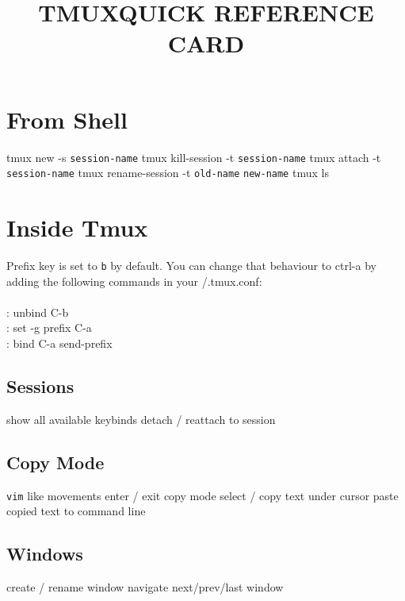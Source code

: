
\def\content{TMUX}
\def\versionnumber{0.1}  %
\def\year{2014}
\def\month{May}
\def\version{v\versionnumber\ \month\ \year}



\title{\content QUICK REFERENCE CARD}

\shortintro

\section{From Shell}{}

	{tmux new -s {\tt session-name}}
	{tmux kill-session -t {\tt session-name}}
	{tmux attach -t {\tt session-name}}
	{tmux rename-session -t {\tt old-name} {\tt new-name}}
	{tmux ls}

\section{Inside Tmux}{Prefix key is set to {\tt \ctrl b} by default. You can
    change that behaviour to ctrl-a by adding the following
    commands in your \tild/.tmux.conf:\\\\
: unbind C-b\\
: set -g prefix C-a\\
: bind C-a send-prefix\\
}

\subsection{Sessions}{}
	{show all available keybinds}
	{detach / reattach to session}

\subsection{Copy Mode}{{\tt vim} like movements}
	{enter / exit copy mode}
	{select / copy text under cursor}
	{paste copied text to command line}

\subsection{Windows}{}
	{create / rename window}
	{navigate next/prev/last window}

